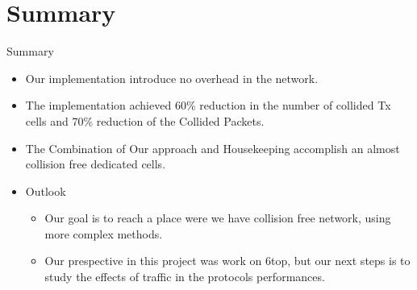 \section{Summary}
\begin{withoutheadline}
\begin{frame}{Summary}
  \begin{itemize}
  \item
    Our implementation introduce  \alert{no overhead } in the network.
  \item
    The implementation \alert{achieved 60\% reduction} in the number of collided Tx cells and \alert{70\% reduction} of the Collided Packets.
  \item The Combination of Our approach and Housekeeping accomplish an \alert{ almost collision free dedicated cells}.
  \end{itemize}
  
  \begin{itemize}
  \item
    Outlook
    \begin{itemize}
    \item
     Our goal is to reach a place were we have collision free network, using more complex methods.
    \item
      Our prespective in this project was work on 6top, but our next steps is to study the effects of traffic in the protocols performances.
    \end{itemize}
  \end{itemize}
\end{frame}
\end{withoutheadline}